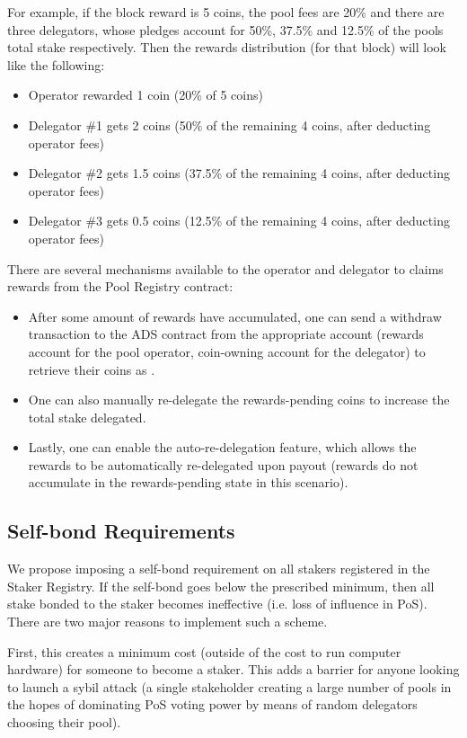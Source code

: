 For example, if the block reward is 5 coins, the pool fees are 20\% and there are three delegators, whose pledges account for 50\%, 37.5\% and 12.5\% of the pools total stake respectively. Then the rewards distribution (for that block) will look like the following: 
\begin{itemize}[label=--,nosep]
    \item Operator rewarded 1 coin (20\% of 5 coins)
    \item Delegator \#1 gets 2 coins (50\% of the remaining 4 coins, after deducting operator fees)
    \item Delegator \#2 gets 1.5 coins (37.5\% of the remaining 4 coins, after deducting operator fees)
    \item Delegator \#3 gets 0.5 coins (12.5\% of the remaining 4 coins, after deducting operator fees)
\end{itemize}

There are several mechanisms available to the operator and delegator to claims rewards from the Pool Registry contract: 
\begin{itemize}[label=--,nosep]
    \item After some amount of rewards have accumulated, one can send a withdraw transaction to the ADS contract from the appropriate account (rewards account for the pool operator, coin-owning account for the delegator) to retrieve their coins as . 
    \item One can also manually re-delegate the rewards-pending coins to increase the total stake delegated. 
    \item Lastly, one can enable the auto-re-delegation feature, which allows the rewards to be automatically re-delegated upon payout (rewards do not accumulate in the rewards-pending state in this scenario). 
\end{itemize}

\subsection{Self-bond Requirements} \label{self_bond}
We propose imposing a self-bond requirement on all stakers registered in the Staker Registry. If the self-bond goes below the prescribed minimum, then all stake bonded to the staker becomes ineffective (i.e. loss of influence in PoS). There are two major reasons to implement such a scheme.

First, this creates a minimum cost (outside of the cost to run computer hardware) for someone to become a staker. This adds a barrier for anyone looking to launch a sybil attack (a single stakeholder creating a large number of pools in the hopes of dominating PoS voting power by means of random delegators choosing their pool). 
 
